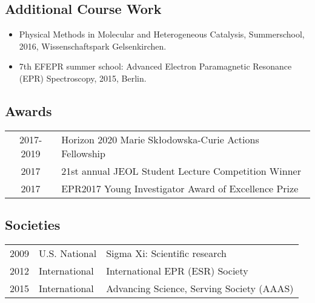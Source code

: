 \subsection*{Additional Course Work} 
\begin{itemize}
\setlength\itemsep{-0.5em}
    \item Physical Methods in Molecular and Heterogeneous Catalysis, Summerschool, 2016,
Wissenschaftspark Gelsenkirchen.
    \item 7th EFEPR summer school: Advanced Electron Paramagnetic Resonance (EPR) Spectroscopy, 2015,
Berlin.
\end{itemize}


\subsection*{Awards} 
\vspace{-0.5em}
\begin{tabular}{cl}
2017-2019 & Horizon 2020 Marie Sk\l{}odowska-Curie Actions Fellowship\\
2017 	& 21st annual JEOL Student Lecture Competition Winner\\
2017 	& EPR2017 Young Investigator Award of Excellence Prize\\
\end{tabular}

\subsection*{Societies} 
\vspace{-0.5em}
\begin{tabular}{rll}
2009 	& U.S. National    & Sigma Xi: Scientific research\\
2012   & International   & International EPR (ESR) Society\\
2015   &  International  & Advancing Science, Serving Society (AAAS)\\
\end{tabular}

